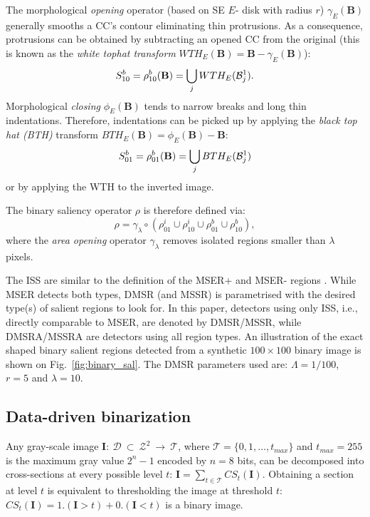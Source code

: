 \documentclass[conference,compsoc]{IEEEtran}
\newcommand {\be}{\begin{equation}}
\newcommand {\ee}{\end{equation}}
\def\B{{\mathbf B}}
\def\I{{\mathbf I}}
\def\mcT{{\mathcal{T}}}
\def\mcD{{\mathcal{D}}}
\def\S{{\mathbf S}}
\begin{document}
The morphological {\em opening} operator (based on SE
$E$- disk with radius $r$)  $\gamma_E(\B)$ generally smooths a CC's contour 
eliminating thin protrusions. As a consequence, protrusions can be obtained by subtracting an opened CC from the original (this is known as the {\it white tophat
transform} $WTH_E(\B) = \B - \gamma_E(\B)$):
\be
S^b_{10} = \rho^b_{10}(\B)=   \bigcup_j WTH_E({\cal B}_j^1) \label{eqn:sal:bor:10}.
\ee
Morphological {\em closing} $\phi_{E}(\B)$ tends to narrow breaks and long thin indentations.
Therefore, indentations can be picked up by applying the {\em black top hat (BTH)} transform  $BTH_E(\B) = \phi_E(\B) - \B$:
\be
S^b_{01} = \rho^b_{01}(\B)=  \bigcup_j BTH_E({\cal B}_j^1) \label{eqn:sal:bor:01}
\ee
or by applying the WTH to the inverted image.

The binary saliency operator $\rho$ is therefore defined via:
\be
\rho = \gamma_\lambda \circ (\rho^i_{01} \cup\rho^i_{10} \cup
\rho^b_{01} \cup \rho^b_{10}),
\ee
where the  {\em area opening} operator  $\gamma_{\lambda}$ removes isolated regions smaller than $\lambda$ pixels.

The ISS are similar to the definition of the MSER+ and MSER- regions \cite{Matas2002BMVC}. While MSER detects both types, DMSR (and MSSR) is parametrised with the desired type(s) of salient regions to look for. In this paper, detectors using only ISS, i.e., directly comparable to MSER, are denoted by DMSR/MSSR, while DMSRA/MSSRA are detectors using all region types. An illustration of the exact shaped binary salient 
regions detected from a synthetic $100 \times 100$ binary image is shown on Fig.~\ref{fig:binary_sal}. The DMSR parameters used are: $\Lambda=1/100$, $r=5$ and $\lambda = 10$.

\subsection{Data-driven binarization}
\label{ssec:binarize}
Any gray-scale image  $\I:~\mcD~\subset~\mathcal{Z}^2~\rightarrow ~\mcT $, where $\mcT=\{0,1,\ldots, t_{max}\}$ and $t_{max}=255$ is the maximum gray value $2^n-1$ encoded by $n=8$ bits, can be decomposed into cross-sections at
every possible level $t$:  $\I = \sum_{t \in \mcT}CS_t(\I)$. Obtaining a section at level $t$ is equivalent to thresholding the image at threshold $t$: $CS_t(\I)= 1.(\I>t) + 0.(\I<t)$ is a binary image. 
\end{document}
